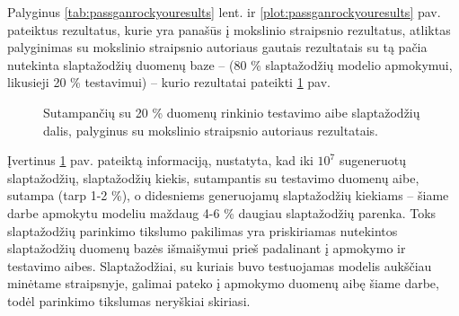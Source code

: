 \documentclass{VUMIFInfBakalaurinis}
\begin{document}
Palyginus \ref{tab:passganrockyouresults} lent. ir 
\ref{plot:passganrockyouresults} pav. pateiktus rezultatus, kurie yra panašūs į 
 mokslinio straipsnio rezultatus, atliktas palyginimas su 
 mokslinio straipsnio autoriaus gautais rezultatais su tą 
pačia nutekinta slaptažodžių duomenų baze --  (80 \% 
slaptažodžių modelio apmokymui, likusieji 20 \% testavimui) -- kurio rezultatai 
pateikti \ref{plot:passgancomparison} pav.

\begin{figure}[!ht]
  \begin{center}
  \end{center}
  \caption{
    Sutampančių su 20 \%  duomenų rinkinio testavimo aibe 
    slaptažodžių dalis, palyginus su  mokslinio straipsnio 
    autoriaus rezultatais.
  }
  \label{plot:passgancomparison}
\end{figure}

Įvertinus \ref{plot:passgancomparison} pav. pateiktą informaciją, nustatyta, kad 
iki $10^7$ sugeneruotų slaptažodžių, slaptažodžių kiekis, sutampantis su 
testavimo duomenų aibe, sutampa (tarp 1-2 \%), o didesniems generuojamų 
slaptažodžių kiekiams -- šiame darbe apmokytu modeliu maždaug 4-6 \% daugiau 
slaptažodžių parenka. Toks slaptažodžių parinkimo tikslumo pakilimas yra 
priskiriamas nutekintos slaptažodžių duomenų bazės  
išmaišymui prieš padalinant į apmokymo ir testavimo aibes. Slaptažodžiai, su 
kuriais buvo testuojamas modelis aukščiau minėtame straipsnyje, galimai pateko į 
apmokymo duomenų aibę šiame darbe, todėl parinkimo tikslumas neryškiai skiriasi.
\end{document}
